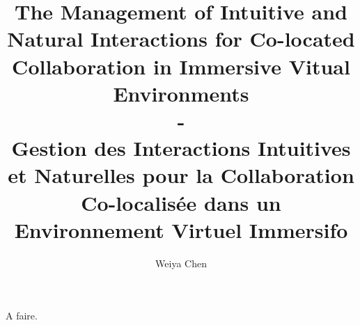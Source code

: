 \documentclass[12pt]{amsart}
\title{The Management of Intuitive and Natural Interactions for Co-located Collaboration in Immersive Vitual Environments\\ 
-
\\
\small{Gestion des Interactions Intuitives et Naturelles pour la Collaboration Co-localisée dans un Environnement Virtuel Immersifo}}
\author{Weiya Chen}
\date{} %
\begin{document}
\maketitle

A faire.
\end{document}
